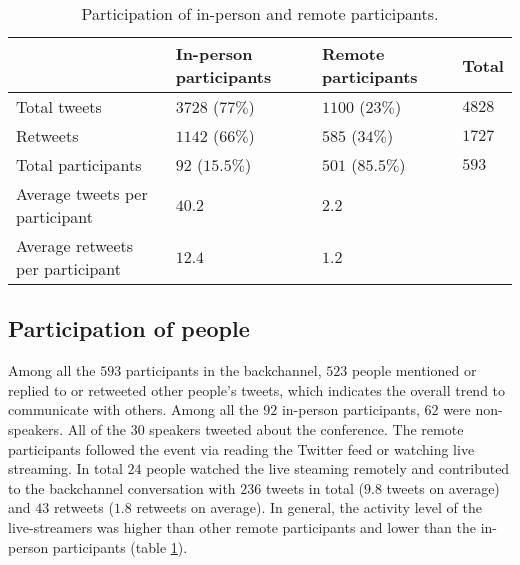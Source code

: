 \documentclass[conference,final]{IEEEtran}
\begin{document}
\begin{table}[tbp]  
  \addtolength{\belowcaptionskip}{-50pt}	
	\setlength\abovecaptionskip{0pt}%
  \setlength\belowcaptionskip{10pt}%
  \caption{Participation of in-person and remote participants.}
	\label{tab:tweets-of-participants}
	\centering
		\begin{tabular}{|l|>{\raggedleft\arraybackslash}p{1.6cm}|>{\raggedleft\arraybackslash}p{1.6cm}|>{\raggedleft\arraybackslash}p{0.8cm}|}
			\hline\hline %
             &  In-person participants & Remote participants  & Total \\%
\hline %
Total tweets & $3728$ ($77\%$) & $1100$ ($23\%$) & $4828$\\ %
\hline
Retweets & $1142$ ($66\%$)  & $585$ ($34\%$) & $1727$ \\
\hline
Total participants & $92$ ($15.5\%$) & $501$ ($85.5\%$) & $593$\\
\hline
Average tweets per participant & $40.2$ & $2.2$ & \\
\hline
Average retweets per participant & $12.4$ & $1.2$ & \\
\hline\hline %
		\end{tabular}
	
\end{table}

\subsection{Participation of people}
Among all the $593$ participants in the backchannel, $523$ people mentioned or replied to or retweeted other people's tweets, which indicates the overall trend to communicate with others. Among all the $92$ in-person participants, $62$ were non-speakers. All of the $30$ speakers tweeted about the conference. The remote participants followed the event via reading the Twitter feed or watching live streaming. In total $24$ people watched the live steaming remotely and contributed to the backchannel conversation with $236$ tweets in total ($9.8$ tweets on average) and $43$ retweets ($1.8$ retweets on average). In general, the activity level of the live-streamers was higher than other remote participants and lower than the in-person participants (table \ref{tab:tweets-of-participants}).
\end{document}
